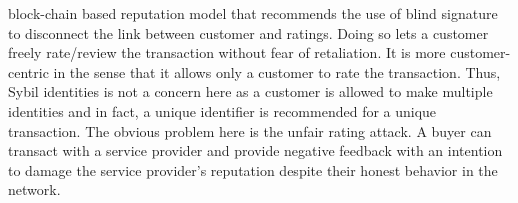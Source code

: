 block-chain based reputation model that recommends the use of blind signature
to disconnect the link between customer and ratings. Doing so lets a customer
freely rate/review the transaction without fear of retaliation. It is more
customer-centric in the sense that it allows only a customer to rate the
transaction. Thus, Sybil identities is not a concern here as a customer is
allowed to make multiple identities and in fact, a unique identifier is
recommended for a unique transaction. The obvious problem here is the unfair
rating attack. A buyer can transact with a service provider and provide negative
feedback with an intention to damage the service provider's reputation despite
their honest behavior in the network. 


%


